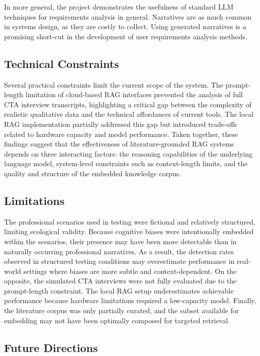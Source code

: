 \documentclass[
  letterpaper,
  DIV=11,
  numbers=noendperiod]{scrartcl}
\begin{document}
In more general, the project demonstrates the usefulness of standard LLM
techniques for requirements analysis in general. Narratives are as much
common in systems design, as they are costly to collect. Using generated
narratives is a promising short-cut in the development of user
requirements analysis methods.

\subsection{Technical Constraints}\label{technical-constraints}

Several practical constraints limit the current scope of the system. The
prompt-length limitation of cloud-based RAG interfaces prevented the
analysis of full CTA interview transcripts, highlighting a critical gap
between the complexity of realistic qualitative data and the technical
affordances of current tools. The local RAG implementation partially
addressed this gap but introduced trade-offs related to hardware
capacity and model performance. Taken together, these findings suggest
that the effectiveness of literature-grounded RAG systems depends on
three interacting factors: the reasoning capabilities of the underlying
language model, system-level constraints such as context-length limits,
and the quality and structure of the embedded knowledge corpus.

\subsection{Limitations}\label{limitations}

The professional scenarios used in testing were fictional and relatively
structured, limiting ecological validity. Because cognitive biases were
intentionally embedded within the scenarios, their presence may have
been more detectable than in naturally occurring professional
narratives. As a result, the detection rates observed in structured
testing conditions may overestimate performance in real-world settings
where biases are more subtle and context-dependent. On the opposite, the
simulated CTA interviews were not fully evaluated due to the
prompt-length constraint. The local RAG setup underestimates achievable
performance because hardware limitations required a low-capacity model.
Finally, the literature corpus was only partially curated, and the
subset available for embedding may not have been optimally composed for
targeted retrieval.

\subsection{Future Directions}\label{future-directions}
\end{document}
